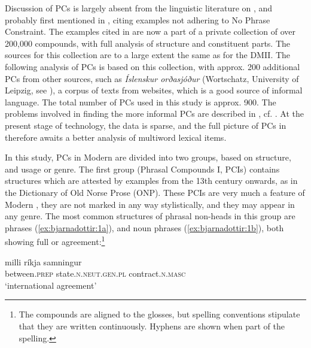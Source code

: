 \documentclass[output=paper]{LSP/langsci}
\begin{document}
Discussion of PCs is largely absent from the linguistic literature on , and probably first mentioned in \citealt{Bjarnadóttir19962005}, citing examples not adhering to  No Phrase Constraint. The  examples cited in \citealt{Bjarnadóttir19962005} are now a part of a private collection of over 200,000  compounds, with full analysis of structure and constituent parts. The sources for this collection are to a large extent the same as for the DMII. The following analysis of PCs is based on this collection, with approx. 200 additional PCs from other sources, such as \textit{Íslenskur orðasjóður} (Wortschatz, University of Leipzig, see \citealt{HallsteinsdóttirEtAl2007}), a corpus of texts from  websites, which is a good source of informal language. The total number of PCs used in this study is approx. 900. The problems involved in finding the more informal PCs are described in , cf. . At the present stage of technology, the data is sparse, and the full picture of PCs in  therefore awaits a better analysis of multiword lexical items.


In this study, PCs in Modern  are divided into two groups, based on structure, and usage or genre. The first group (Phrasal Compounds I, PCIs) contains structures which are attested by examples from the 13th century onwards, as in the Dictionary of Old Norse Prose (ONP). These PCIs are very much a feature of Modern , they are not marked in any way stylistically, and they may appear in any genre. The most common structures of phrasal non-heads in this group are  phrases (\ref{ex:bjarnadottir:1a}), and  noun phrases (\ref{ex:bjarnadottir:1b}), both showing full  or agreement:\footnote{The compounds are aligned to the glosses, but  spelling conventions stipulate that they are written continuously. Hyphens are shown when part of the spelling.}


\ea%
 \label{ex:bjarnadottir:1} 
\ea \label{ex:bjarnadottir:1a} 
\gll milli ríkja samningur\\
 between.\textsc{prep} state.\textsc{n.neut.gen.pl} contract.\textsc{n.masc}\\
\glt ‘international agreement’
\end{document}
